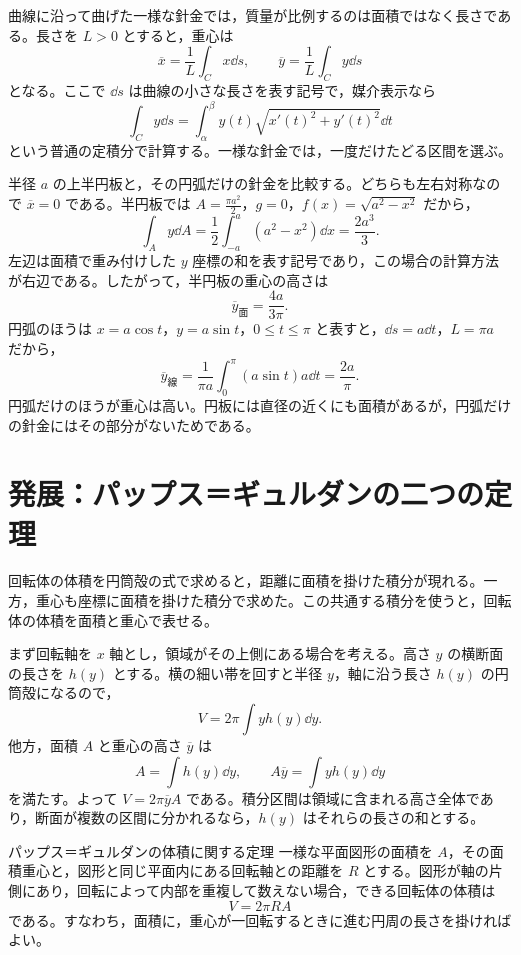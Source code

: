 曲線に沿って曲げた一様な針金では，質量が比例するのは面積ではなく長さである。長さを $L>0$ とすると，重心は
\begin{equation}\label{式:線の重心}
\overline x=\frac1L\int_C x\dd s,\qquad
\overline y=\frac1L\int_C y\dd s
\end{equation}
となる。ここで $\dd s$ は曲線の小さな長さを表す記号で，媒介表示なら
\[
\int_C y\dd s
 =\int_\alpha^\beta y(t)\sqrt{x'(t)^2+y'(t)^2}\dd t
\]
という普通の定積分で計算する。一様な針金では，一度だけたどる区間を選ぶ。

半径 $a$ の上半円板と，その円弧だけの針金を比較する。どちらも左右対称なので $\overline x=0$ である。半円板では $A=\frac{\pi a^2}{2}$，$g=0$，$f(x)=\sqrt{a^2-x^2}$ だから，
\[
\int_A y\dd A
 =\frac12\int_{-a}^a(a^2-x^2)\dd x
 =\frac{2a^3}{3}.
\]
左辺は面積で重み付けした $y$ 座標の和を表す記号であり，この場合の計算方法が右辺である。したがって，半円板の重心の高さは
\begin{equation}\label{式:半円板の重心}
\overline y_{\mathrm{面}}=\frac{4a}{3\pi}.
\end{equation}
円弧のほうは $x=a\cos t$，$y=a\sin t$，$0\leq t\leq\pi$ と表すと，$\dd s=a\dd t$，$L=\pi a$ だから，
\begin{equation}\label{式:半円弧の重心}
\overline y_{\mathrm{線}}
 =\frac{1}{\pi a}\int_0^\pi(a\sin t)a\dd t
 =\frac{2a}{\pi}.
\end{equation}
円弧だけのほうが重心は高い。円板には直径の近くにも面積があるが，円弧だけの針金にはその部分がないためである。

\section{発展：パップス＝ギュルダンの二つの定理}\label{節:パップスの定理}

回転体の体積を円筒殻の式で求めると，距離に面積を掛けた積分が現れる。一方，重心も座標に面積を掛けた積分で求めた。この共通する積分を使うと，回転体の体積を面積と重心で表せる。

まず回転軸を $x$ 軸とし，領域がその上側にある場合を考える。高さ $y$ の横断面の長さを $h(y)$ とする。横の細い帯を回すと半径 $y$，軸に沿う長さ $h(y)$ の円筒殻になるので，
\[
V=2\pi\int y h(y)\dd y.
\]
他方，面積 $A$ と重心の高さ $\overline y$ は
\[
A=\int h(y)\dd y,\qquad
A\overline y=\int y h(y)\dd y
\]
を満たす。よって $V=2\pi\overline y A$ である。積分区間は領域に含まれる高さ全体であり，断面が複数の区間に分かれるなら，$h(y)$ はそれらの長さの和とする。

\begin{theorem}{パップス＝ギュルダンの体積に関する定理}
一様な平面図形の面積を $A$，その面積重心と，図形と同じ平面内にある回転軸との距離を $R$ とする。図形が軸の片側にあり，回転によって内部を重複して数えない場合，できる回転体の体積は
\[
V=2\pi R A
\]
である。すなわち，面積に，重心が一回転するときに進む円周の長さを掛ければよい。
\end{theorem}

